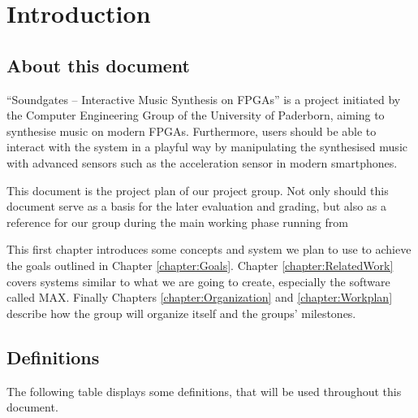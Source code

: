 \chapter{Introduction}
	\label{chapter:Introduction}
	\section{About this document}
	
"`Soundgates – Interactive Music Synthesis on FPGAs"' is a project initiated by the Computer Engineering Group of the University of Paderborn, aiming to synthesise music on modern FPGAs. 
Furthermore, users should be able to interact with the system in a playful way by manipulating the synthesised music with advanced sensors such as the acceleration sensor in modern smartphones.


This document is the project plan of our project group.
Not only should this document serve as a basis for the later evaluation and grading, 
but also as a reference for our group during the main working phase running from 

This first chapter introduces some concepts and system we plan to use to achieve the goals outlined in Chapter \ref{chapter:Goals}. 
Chapter \ref{chapter:RelatedWork} covers systems similar to what we are going to create, especially the software called MAX.	
Finally Chapters \ref{chapter:Organization} and \ref{chapter:Workplan} describe how the group will organize itself and the groups' milestones.

	\section{Definitions}
	 The following table displays some definitions, that will be used throughout this document.\\
	
	 
